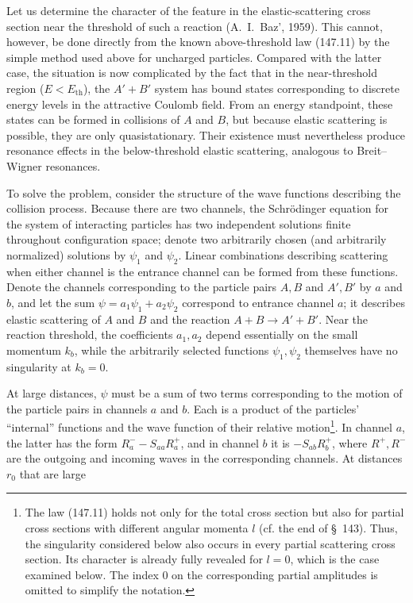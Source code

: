 Let us determine the character of the feature in the elastic-scattering cross section near the threshold of such a reaction (A.~I.~Baz', 1959). This cannot, however, be done directly from the known above-threshold law (147.11) by the simple method used above for uncharged particles. Compared with the latter case, the situation is now complicated by the fact that in the near-threshold region ($E<E_{\mathrm{th}}$), the $A'+B'$ system has bound states corresponding to discrete energy levels in the attractive Coulomb field. From an energy standpoint, these states can be formed in collisions of $A$ and $B$, but because elastic scattering is possible, they are only quasistationary. Their existence must nevertheless produce resonance effects in the below-threshold elastic scattering, analogous to Breit--Wigner resonances.

To solve the problem, consider the structure of the wave functions describing the collision process. Because there are two channels, the Schrödinger equation for the system of interacting particles has two independent solutions finite throughout configuration space; denote two arbitrarily chosen (and arbitrarily normalized) solutions by $\psi_1$ and $\psi_2$. Linear combinations describing scattering when either channel is the entrance channel can be formed from these functions. Denote the channels corresponding to the particle pairs $A,B$ and $A',B'$ by $a$ and $b$, and let the sum $\psi=a_1\psi_1+a_2\psi_2$ correspond to entrance channel $a$; it describes elastic scattering of $A$ and $B$ and the reaction $A+B\to A'+B'$. Near the reaction threshold, the coefficients $a_1,a_2$ depend essentially on the small momentum $k_b$, while the arbitrarily selected functions $\psi_1,\psi_2$ themselves have no singularity at $k_b=0$.

At large distances, $\psi$ must be a sum of two terms corresponding to the motion of the particle pairs in channels $a$ and $b$. Each is a product of the particles' ``internal'' functions and the wave function of their relative motion\footnote{The law (147.11) holds not only for the total cross section but also for partial cross sections with different angular momenta $l$ (cf. the end of \S~143). Thus, the singularity considered below also occurs in every partial scattering cross section. Its character is already fully revealed for $l=0$, which is the case examined below. The index 0 on the corresponding partial amplitudes is omitted to simplify the notation.}. In channel $a$, the latter has the form $R_a^- -S_{aa}R_a^+$, and in channel $b$ it is $-S_{ab}R_b^+$, where $R^+,R^-$ are the outgoing and incoming waves in the corresponding channels. At distances $r_0$ that are large

